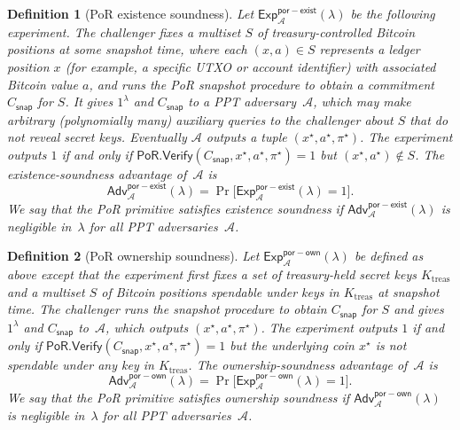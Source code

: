 \documentclass[11pt]{article}
\newtheorem{definition}{Definition}
\begin{document}
\begin{definition}[PoR existence soundness]
\label{def:por-existence}
Let $\mathsf{Exp}^{\mathsf{por-exist}}_{\mathcal{A}}(\lambda)$ be the following experiment.
The challenger fixes a multiset $S$ of treasury-controlled Bitcoin positions at some snapshot time, where each $(x,a)\in S$ represents a ledger position $x$ (for example, a specific UTXO or account identifier) with associated Bitcoin value $a$, and runs
the PoR snapshot procedure to obtain a commitment $C_{\mathsf{snap}}$ for $S$.
It gives $1^\lambda$ and $C_{\mathsf{snap}}$ to a PPT adversary~$\mathcal{A}$, which may make arbitrary
(polynomially many) auxiliary queries to the challenger about $S$ that do not reveal secret keys.
Eventually $\mathcal{A}$ outputs a tuple $(x^\star,a^\star,\pi^\star)$.
The experiment outputs $1$ if and only if
$\mathsf{PoR.Verify}(C_{\mathsf{snap}},x^\star,a^\star,\pi^\star)=1$ but $(x^\star,a^\star)\not\in S$.
The \emph{existence-soundness advantage} of~$\mathcal{A}$ is
\[
  \mathsf{Adv}^{\mathsf{por-exist}}_{\mathcal{A}}(\lambda)
  = \Pr\big[\mathsf{Exp}^{\mathsf{por-exist}}_{\mathcal{A}}(\lambda)=1\big].
\]
We say that the PoR primitive satisfies existence soundness if $\mathsf{Adv}^{\mathsf{por-exist}}_{\mathcal{A}}(\lambda)$
is negligible in~$\lambda$ for all PPT adversaries~$\mathcal{A}$.
\end{definition}

\begin{definition}[PoR ownership soundness]
\label{def:por-ownership}
Let $\mathsf{Exp}^{\mathsf{por-own}}_{\mathcal{A}}(\lambda)$ be defined as above except that the experiment first fixes
a set of treasury-held secret keys $K_{\mathrm{treas}}$ and a multiset $S$ of Bitcoin positions spendable under keys in $K_{\mathrm{treas}}$ at snapshot time.
The challenger runs the snapshot procedure to obtain $C_{\mathsf{snap}}$ for $S$ and gives $1^\lambda$ and $C_{\mathsf{snap}}$
to~$\mathcal{A}$, which outputs $(x^\star,a^\star,\pi^\star)$.
The experiment outputs $1$ if and only if
$\mathsf{PoR.Verify}(C_{\mathsf{snap}},x^\star,a^\star,\pi^\star)=1$ but the underlying coin $x^\star$ is not spendable
under any key in $K_{\mathrm{treas}}$.
The \emph{ownership-soundness advantage} of~$\mathcal{A}$ is
\[
  \mathsf{Adv}^{\mathsf{por-own}}_{\mathcal{A}}(\lambda)
  = \Pr\big[\mathsf{Exp}^{\mathsf{por-own}}_{\mathcal{A}}(\lambda)=1\big].
\]
We say that the PoR primitive satisfies ownership soundness if $\mathsf{Adv}^{\mathsf{por-own}}_{\mathcal{A}}(\lambda)$
is negligible in~$\lambda$ for all PPT adversaries~$\mathcal{A}$.
\end{definition}
\end{document}
